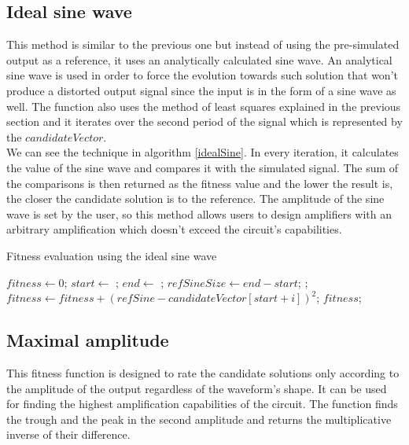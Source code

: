 \subsection{Ideal sine wave}
This method is similar to the previous one but instead of using the pre-simulated output as a reference, it uses an analytically calculated sine wave. An analytical sine wave is used in order to force the evolution towards such solution that won't produce a distorted output signal since the input is in the form of a sine wave as well. The function also uses the method of least squares explained in the previous section and it iterates over the second period of the signal which is represented by the $candidateVector$.\\
We can see the technique in algorithm \ref{idealSine}. In every iteration, it calculates the value of the sine wave and compares it with the simulated signal. The sum of the comparisons is then returned as the fitness value and the lower the result is, the closer the candidate solution is to the reference. The amplitude of the sine wave is set by the user, so this method allows users to design amplifiers with an arbitrary amplification which doesn't exceed the circuit's capabilities.

\begin{algorithm}
\caption{Fitness evaluation using the ideal sine wave}
\label{idealSine}
\begin{algorithmic}[1]
        \State $fitness \gets 0$;
        \State $start \gets$ ;
        \State $end \gets$ ;
        \State $refSineSize \gets end - start$;
           \State {};
           \State $fitness \gets fitness + (refSine - candidateVector[start + i])^2$;
        \EndFor
        \State \Return $fitness$;
    \EndFunction
\end{algorithmic}
\end{algorithm}

\subsection{Maximal amplitude}
This fitness function is designed to rate the candidate solutions only according to the amplitude of the output regardless of the waveform's shape. It can be used for finding the highest amplification capabilities of the circuit. The function finds the trough and the peak in the second amplitude and returns the multiplicative inverse of their difference.

